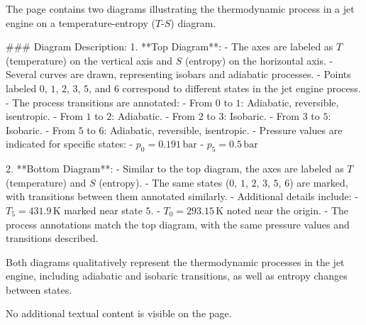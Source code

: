 The page contains two diagrams illustrating the thermodynamic process in a jet engine on a temperature-entropy (\(T\)-\(S\)) diagram.  

### Diagram Description:  
1. **Top Diagram**:  
   - The axes are labeled as \(T\) (temperature) on the vertical axis and \(S\) (entropy) on the horizontal axis.  
   - Several curves are drawn, representing isobars and adiabatic processes.  
   - Points labeled \(0\), \(1\), \(2\), \(3\), \(5\), and \(6\) correspond to different states in the jet engine process.  
   - The process transitions are annotated:  
     - From \(0\) to \(1\): Adiabatic, reversible, isentropic.  
     - From \(1\) to \(2\): Adiabatic.  
     - From \(2\) to \(3\): Isobaric.  
     - From \(3\) to \(5\): Isobaric.  
     - From \(5\) to \(6\): Adiabatic, reversible, isentropic.  
   - Pressure values are indicated for specific states:  
     - \(p_0 = 0.191 \, \text{bar}\)  
     - \(p_5 = 0.5 \, \text{bar}\)  

2. **Bottom Diagram**:  
   - Similar to the top diagram, the axes are labeled as \(T\) (temperature) and \(S\) (entropy).  
   - The same states (\(0\), \(1\), \(2\), \(3\), \(5\), \(6\)) are marked, with transitions between them annotated similarly.  
   - Additional details include:  
     - \(T_5 = 431.9 \, \text{K}\) marked near state \(5\).  
     - \(T_0 = 293.15 \, \text{K}\) noted near the origin.  
   - The process annotations match the top diagram, with the same pressure values and transitions described.  

Both diagrams qualitatively represent the thermodynamic processes in the jet engine, including adiabatic and isobaric transitions, as well as entropy changes between states.  

No additional textual content is visible on the page.